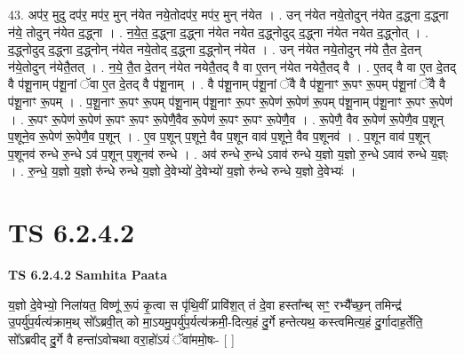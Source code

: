 \documentclass[17pt]{extarticle}
\begin{document}
43. अप॑र॒ मुदु दप॑र॒ मप॑र॒ मुन् न॑येत नये॒तोदप॑र॒ मप॑र॒ मुन् न॑येत । . उन् न॑येत नये॒तोदुन् न॑येत द॒द्ध्ना द॒द्ध्ना न॑ये॒ तोदुन् न॑येत द॒द्ध्ना । . न॒ये॒त॒ द॒द्ध्ना द॒द्ध्ना न॑येत नयेत द॒द्ध्नोदुद् द॒द्ध्ना न॑येत नयेत द॒द्ध्नोत् । . द॒द्ध्नोदुद् द॒द्ध्ना द॒द्ध्नोन् न॑येत नये॒तोद् द॒द्ध्ना द॒द्ध्नोन् न॑येत । . उन् न॑येत नये॒तोदुन् न॑ये तै॒त दे॒तन् न॑ये॒तोदुन् न॑येतै॒तत् । . न॒ये॒ तै॒त दे॒तन् न॑येत नयेतै॒तद् वै वा ए॒तन् न॑येत नयेतै॒तद् वै । . ए॒तद् वै वा ए॒त दे॒तद् वै प॑शू॒नाम् प॑शू॒नां ॅवा ए॒त दे॒तद् वै प॑शू॒नाम् । . वै प॑शू॒नाम् प॑शू॒नां ॅवै वै प॑शू॒नाꣳ रू॒पꣳ रू॒पम् प॑शू॒नां ॅवै वै प॑शू॒नाꣳ रू॒पम् । . प॒शू॒नाꣳ रू॒पꣳ रू॒पम् प॑शू॒नाम् प॑शू॒नाꣳ रू॒पꣳ रू॒पेण॑ रू॒पेण॑ रू॒पम् प॑शू॒नाम् प॑शू॒नाꣳ रू॒पꣳ रू॒पेण॑ । . रू॒पꣳ रू॒पेण॑ रू॒पेण॑ रू॒पꣳ रू॒पꣳ रू॒पेणै॒वैव रू॒पेण॑ रू॒पꣳ रू॒पꣳ रू॒पेणै॒व । . रू॒पेणै॒ वैव रू॒पेण॑ रू॒पेणै॒व प॒शून् प॒शूने॒व रू॒पेण॑ रू॒पेणै॒व प॒शून् । . ए॒व प॒शून् प॒शूने॒ वैव प॒शून वाव॑ प॒शूने॒ वैव प॒शूनव॑ । . प॒शून वाव॑ प॒शून् प॒शूनव॑ रुन्धे रु॒न्धे ऽव॑ प॒शून् प॒शूनव॑ रुन्धे । . अव॑ रुन्धे रु॒न्धे ऽवाव॑ रुन्धे य॒ज्ञो य॒ज्ञो रु॒न्धे ऽवाव॑ रुन्धे य॒ज्ञ्ः । . रु॒न्धे॒ य॒ज्ञो य॒ज्ञो रु॑न्धे रुन्धे य॒ज्ञो दे॒वेभ्यो॑ दे॒वेभ्यो॑ य॒ज्ञो रु॑न्धे रुन्धे य॒ज्ञो दे॒वेभ्यः॑ । \newline
\pagebreak
{}

\section{ TS 6.2.4.2 }

\textbf{TS 6.2.4.2 } \newline
\textbf{Samhita Paata} \newline

य॒ज्ञो दे॒वेभ्यो॒ निला॑यत॒ विष्णू॑ रू॒पं कृ॒त्वा स पृ॑थि॒वीं प्रावि॑श॒त् तं दे॒वा हस्ता᳚न्थ् सꣳ॒॒ रभ्यै᳚च्छ॒न् तमिन्द्र॑ उ॒पर्यु॑प॒र्यत्य॑क्राम॒थ् सो᳚ऽब्रवी॒त् को मा॒ऽयमु॒पर्यु॑प॒र्यत्य॑क्रमी॒-दित्य॒हं दु॒र्गे हन्तेत्यथ॒ कस्त्वमित्य॒हं दु॒र्गादाह॒र्तेति॒ सो᳚ऽब्रवीद् दु॒र्गे वै हन्ता॑ऽवोचथा वरा॒हो॑ऽयं ॅवा॑ममो॒षः- [  ] \newline
\end{document}
